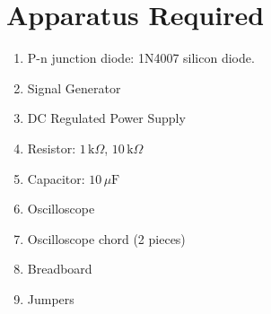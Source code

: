 \section{Apparatus Required}

\begin{enumerate}
  \setlength{\itemsep}{0pt}
        \setlength{\parskip}{0pt}
        \setlength{\parsep}{0pt}
  \item P-n junction diode: 1N4007 silicon diode.
  \item Signal Generator
  \item DC Regulated Power Supply
  \item Resistor: $1\,\text{k}\Omega$, $10\,\text{k}\Omega$
  \item Capacitor: $10\,\mu\mathrm{F}$
  \item Oscilloscope
  \item Oscilloscope chord (2 pieces)
  \item Breadboard
  \item Jumpers
\end{enumerate}

